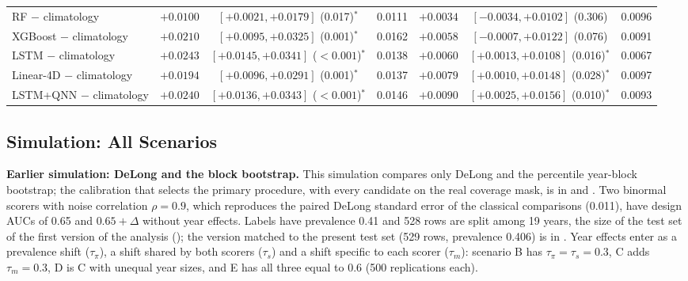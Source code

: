 \documentclass[11pt,a4paper]{article}
\begin{document}
\begin{table}[htbp]
{{\begin{tabular}{@{}lcccccc@{}}
\midrule
RF $-$ climatology & $+0.0100$ & $[+0.0021,+0.0179]$ (0.017)$^{*}$ & 0.0111 & $+0.0034$ & $[-0.0034,+0.0102]$ (0.306) & 0.0096 \\
XGBoost $-$ climatology & $+0.0210$ & $[+0.0095,+0.0325]$ (0.001)$^{*}$ & 0.0162 & $+0.0058$ & $[-0.0007,+0.0122]$ (0.076) & 0.0091 \\
LSTM $-$ climatology & $+0.0243$ & $[+0.0145,+0.0341]$ ($<0.001$)$^{*}$ & 0.0138 & $+0.0060$ & $[+0.0013,+0.0108]$ (0.016)$^{*}$ & 0.0067 \\
Linear-4D $-$ climatology & $+0.0194$ & $[+0.0096,+0.0291]$ (0.001)$^{*}$ & 0.0137 & $+0.0079$ & $[+0.0010,+0.0148]$ (0.028)$^{*}$ & 0.0097 \\
LSTM+QNN $-$ climatology & $+0.0240$ & $[+0.0136,+0.0343]$ ($<0.001$)$^{*}$ & 0.0146 & $+0.0090$ & $[+0.0025,+0.0156]$ (0.010)$^{*}$ & 0.0093 \\
\bottomrule
\end{tabular}}}
\end{table}

\subsection{Simulation: All Scenarios}
\label{app:sim_all}

\textbf{Earlier simulation: DeLong and the block bootstrap.} This simulation compares only DeLong and the percentile year-block bootstrap; the calibration that selects the primary procedure, with every candidate on the real coverage mask, is in  and . Two binormal scorers with noise correlation $\rho=0.9$, which reproduces the paired DeLong standard error of the classical comparisons (0.011), have design AUCs of 0.65 and $0.65+\Delta$ without year effects. Labels have prevalence 0.41 and 528 rows are split among 19 years, the size of the test set of the first version of the analysis (); the version matched to the present test set (529 rows, prevalence 0.406) is in . Year effects enter as a prevalence shift ($\tau_\pi$), a shift shared by both scorers ($\tau_s$) and a shift specific to each scorer ($\tau_m$): scenario B has $\tau_\pi=\tau_s=0.3$, C adds $\tau_m=0.3$, D is C with unequal year sizes, and E has all three equal to 0.6 (500 replications each).
\end{document}
